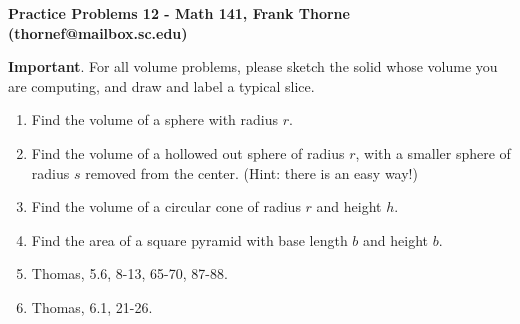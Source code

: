 \documentclass[12pt]{article}
\begin{document}
\setlength{\topmargin}{-2mm}





\begin{center}{\bf Practice Problems 12 - Math 141, Frank Thorne (thornef@mailbox.sc.edu)}

\medskip

\medskip

\end{center}
\vskip -0.1in

{\bf Important}. For all volume problems, please sketch the solid whose volume you are computing,
and draw and label a typical slice.


\begin{enumerate}

\item Find the volume of a sphere with radius $r$.
\item Find the volume of a hollowed out sphere of radius $r$, with a smaller sphere of radius $s$ removed
from the center. (Hint: there is an easy way!)
\item Find the volume of a circular cone of radius $r$ and height $h$.
\item Find the area of a square pyramid with base length $b$ and height $b$.

\item 
Thomas, 5.6, 8-13, 65-70, 87-88.
\item
Thomas, 6.1, 21-26.
\end{enumerate}
\end{document}
